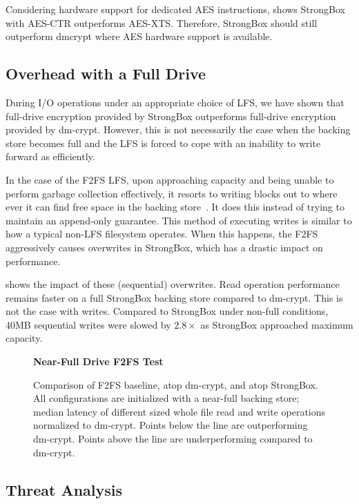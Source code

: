 Considering hardware support for dedicated AES instructions,
 shows StrongBox with AES-CTR outperforms
AES-XTS. Therefore, StrongBox should still outperform dmcrypt where AES hardware
support is available.

\subsection{Overhead with a Full Drive}
During I/O operations under an appropriate choice of LFS, we have shown that
full-drive encryption provided by StrongBox outperforms full-drive encryption
provided by dm-crypt. However, this is not necessarily the case when the backing
store becomes full and the LFS is forced to cope with an inability to write
forward as efficiently.

In the case of the F2FS LFS, upon approaching capacity and being unable to
perform garbage collection effectively, it resorts to writing blocks out to
where ever it can find free space in the backing store~\cite{F2FS}. It does this
instead of trying to maintain an append-only guarantee. This method of executing
writes is similar to how a typical non-LFS filesystem operates. When this
happens, the F2FS aggressively causes overwrites in StrongBox, which has a
drastic impact on performance.

 shows the impact of these (sequential) overwrites.
Read operation performance remains faster on a full StrongBox backing store
compared to dm-crypt. This is not the case with writes. Compared to StrongBox
under non-full conditions, 40MB sequential writes were slowed by $2.8\times$ as
StrongBox approached maximum capacity.

\begin{figure}[ht]
    \textbf{Near-Full Drive F2FS Test}\par\medskip
    \centering
    {}
    \caption{Comparison of F2FS baseline, atop dm-crypt, and atop
      StrongBox. All configurations are initialized with a near-full
      backing store; median latency of different sized whole file read
      and write operations normalized to dm-crypt. Points below the
      line are outperforming dm-crypt. Points above the line are
      underperforming compared to dm-crypt.}
   \label{fig:microbench-f2fs-full}
\end{figure}

\subsection{Threat Analysis}

